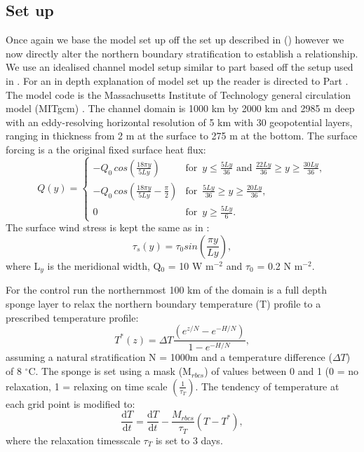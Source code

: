 \subsection{Set up}

Once again we base the model set up off the set up described in  () however we now directly alter the northern boundary stratification to establish a relationship.
We use an idealised channel model setup similar to part  based off the setup used in \citet{Abernathey2011}. For an in depth explanation of model set up the reader is directed to Part . The model code is the Massachusetts Institute of Technology general circulation model (MITgcm) \citep{marshall1997}. The channel domain is 1000 km by 2000 km and 2985 m deep with an eddy-resolving horizontal resolution of 5 km with 30 geopotential layers, ranging in thickness from 2 m at the surface to 275 m at the bottom. The surface forcing is a  the original fixed surface heat flux:
\begin{equation*}
Q(y)=
\begin{cases}
-Q_{0}\,cos(\frac{18\pi y}{5Ly}) & \text{for }\, y \le \frac{5Ly}{36} \text{ and } \frac{22Ly}{36} \geq y \geq \frac{30Ly}{36},\\
-Q_{0}\,cos(\frac{18 \pi y}{5Ly}-\frac{\pi}{2}) & \text{for }\, \frac{5Ly}{36} \geq y \geq \frac{20Ly}{36},\\
0 & \text{for }\, y \geq \frac{5Ly}{6}.
\end{cases}
\end{equation*}
The surface wind stress is kept the same as in \cite{Abernathey2011}:
\begin{equation*}
\tau_s(y)=\tau_0 sin(\frac{\pi y}{Ly}),
\end{equation*}
where L$_y$ is the meridional width, Q$_0$ = 10 W m$^{-2}$ and $\tau_0$ = 0.2 N m$^{-2}$.

For the control run the northernmost 100 km of the domain is a full depth sponge layer to relax the northern boundary temperature (T) profile to a prescribed temperature profile:
\begin{equation*} 
T^*(z)=\Delta T\frac{(e^{z/N}-e^{-H/N})}{1-e^{-H/N}} ,
\end{equation*} 
assuming a natural stratification N = 1000m and a temperature difference ($\Delta T$) of 8 $^{\circ}$C. The sponge is set using a mask (M$_{rbcs}$) of values between 0 and 1 (0 = no relaxation, 1 = relaxing on time scale $\left( \displaystyle{\frac{1}{\tau_{T}}}\right)$. The tendency of temperature at each grid point is modified to:
\begin{equation*}
\frac{\mathrm{d}T}{\mathrm{d}t}=\frac{\mathrm{d}T}{\mathrm{d}t}-\frac{M_{rbcs}}{\tau_{T}}(T-T^*),
\end{equation*}
where the relaxation timesscale $\tau _T$ is set to 3 days. 

